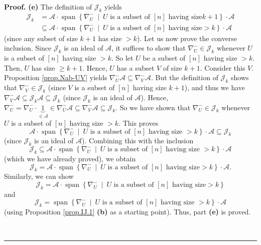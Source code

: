 \documentclass[numbers=enddot,12pt,final,onecolumn,notitlepage]{scrartcl}%
\numberwithin{exer}{subsection}
\theoremstyle{definition}
\newenvironment{proof}[1][Proof]{\noindent\textbf{#1.} }{\ \rule{0.5em}{0.5em}}
\begin{document}
\begin{proof}
\textbf{(e)} The definition of $\mathcal{J}_{k}$ yields%
\begin{align*}
\mathcal{J}_{k}  &  =\mathcal{A}\cdot\operatorname*{span}\left\{  \nabla
_{U}^{-}\ \mid\ U\text{ is a subset of }\left[  n\right]  \text{ having size
}k+1\right\}  \cdot\mathcal{A}\\
&  \subseteq\mathcal{A}\cdot\operatorname*{span}\left\{  \nabla_{U}^{-}%
\ \mid\ U\text{ is a subset of }\left[  n\right]  \text{ having size
}>k\right\}  \cdot\mathcal{A}%
\end{align*}
(since any subset of size $k+1$ has size $>k$). Let us now prove the converse
inclusion. Since $\mathcal{J}_{k}$ is an ideal of $\mathcal{A}$, it suffices
to show that $\nabla_{U}^{-}\in\mathcal{J}_{k}$ whenever $U$ is a subset of
$\left[  n\right]  $ having size $>k$. So let $U$ be a subset of $\left[
n\right]  $ having size $>k$. Then, $U$ has size $\geq k+1$. Hence, $U$ has a
subset $V$ of size $k+1$. Consider this $V$. Proposition \ref{prop.Nab-UV}
yields $\nabla_{U}^{-}\mathcal{A}\subseteq\nabla_{V}^{-}\mathcal{A}$. But the
definition of $\mathcal{J}_{k}$ shows that $\nabla_{V}^{-}\in\mathcal{J}_{k}$
(since $V$ is a subset of $\left[  n\right]  $ having size $k+1$), and thus we
have $\nabla_{V}^{-}\mathcal{A}\subseteq\mathcal{J}_{k}\mathcal{A}%
\subseteq\mathcal{J}_{k}$ (since $\mathcal{J}_{k}$ is an ideal of
$\mathcal{A}$). Hence, $\nabla_{U}^{-}=\nabla_{U}^{-}\cdot\underbrace{1}%
_{\in\mathcal{A}}\in\nabla_{U}^{-}\mathcal{A}\subseteq\nabla_{V}%
^{-}\mathcal{A}\subseteq\mathcal{J}_{k}$. So we have shown that $\nabla
_{U}^{-}\in\mathcal{J}_{k}$ whenever $U$ is a subset of $\left[  n\right]  $
having size $>k$. This proves
\[
\mathcal{A}\cdot\operatorname*{span}\left\{  \nabla_{U}^{-}\ \mid\ U\text{ is
a subset of }\left[  n\right]  \text{ having size }>k\right\}  \cdot
\mathcal{A}\subseteq\mathcal{J}_{k}%
\]
(since $\mathcal{J}_{k}$ is an ideal of $\mathcal{A}$). Combining this with
the inclusion%
\[
\mathcal{J}_{k}\subseteq\mathcal{A}\cdot\operatorname*{span}\left\{
\nabla_{U}^{-}\ \mid\ U\text{ is a subset of }\left[  n\right]  \text{ having
size }>k\right\}  \cdot\mathcal{A}%
\]
(which we have already proved), we obtain%
\[
\mathcal{J}_{k}=\mathcal{A}\cdot\operatorname*{span}\left\{  \nabla_{U}%
^{-}\ \mid\ U\text{ is a subset of }\left[  n\right]  \text{ having size
}>k\right\}  \cdot\mathcal{A}.
\]
Similarly, we can show%
\[
\mathcal{J}_{k}=\mathcal{A}\cdot\operatorname*{span}\left\{  \nabla_{U}%
^{-}\ \mid\ U\text{ is a subset of }\left[  n\right]  \text{ having size
}>k\right\}
\]
and%
\[
\mathcal{J}_{k}=\operatorname*{span}\left\{  \nabla_{U}^{-}\ \mid\ U\text{ is
a subset of }\left[  n\right]  \text{ having size }>k\right\}  \cdot
\mathcal{A}%
\]
(using Proposition \ref{prop.IJ.1} \textbf{(b)} as a starting point). Thus,
part \textbf{(e)} is proved. \medskip


\end{proof}
\end{document}
